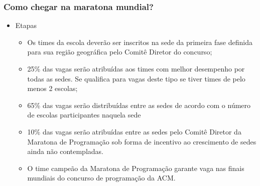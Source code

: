 \begin{frame}
  \frametitle{Como chegar na maratona mundial?}
  \begin{itemize}
    \item Etapas
    \begin{itemize}
      \item {\footnotesize Os times da escola deverão ser inscritos na sede da primeira fase definida para sua região geográfica pelo Comitê Diretor do concurso};
      \item {\footnotesize 25\% das vagas serão atribuídas aos times com melhor desempenho por todas as sedes. Se qualifica para vagas deste tipo se tiver times de pelo menos 2 escolas;}
      \item {\footnotesize 65\% das vagas serão distribuídas entre as sedes de acordo com o número de escolas participantes naquela sede}
      \item {\footnotesize 10\% das vagas serão atribuídas entre as sedes pelo Comitê Diretor da Maratona de Programação sob forma de incentivo ao crescimento de sedes ainda não contempladas.}
      \item {\footnotesize O time campeão da Maratona de Programação garante vaga nas finais mundiais do concurso de programação da ACM.\@}
    \end{itemize}
  \end{itemize}
\end{frame}